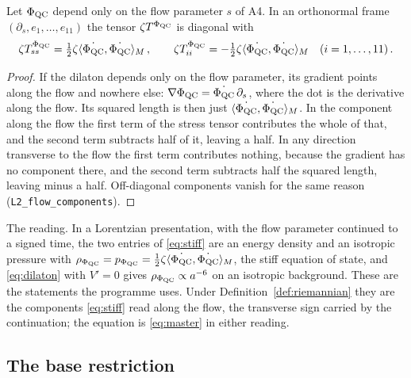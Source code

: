 \begin{proposition}\label{prop:stiff}
Let $\Phi_{\mathrm{QC}}$ depend only on the flow parameter $s$ of A4. In an orthonormal
frame $(\partial_{s},e_{1},\dots,e_{11})$ the tensor $\zeta T^{\Phi_{\mathrm{QC}}}$ is
diagonal with
\begin{equation}\label{eq:stiff}
  \zeta T^{\Phi_{\mathrm{QC}}}_{ss}=\tfrac12\zeta\langle\dot{\Phi_{\mathrm{QC}}},\dot{\Phi_{\mathrm{QC}}}\rangle_{M}\,,\qquad
  \zeta T^{\Phi_{\mathrm{QC}}}_{ii}=-\tfrac12\zeta\langle\dot{\Phi_{\mathrm{QC}}},\dot{\Phi_{\mathrm{QC}}}\rangle_{M}\quad(i=1,\dots,11)\,.
\end{equation}
\end{proposition}

\begin{proof}
If the dilaton depends only on the flow parameter, its gradient points
along the flow and nowhere else: $\nabla\Phi_{\mathrm{QC}}=\dot{\Phi_{\mathrm{QC}}}\,\partial_{s}$, where
the dot is the derivative along the flow. Its squared length is then just
$\langle\dot{\Phi_{\mathrm{QC}}},\dot{\Phi_{\mathrm{QC}}}\rangle_{M}$. In the component along the flow the
first term of the stress tensor contributes the whole of that, and the
second term subtracts half of it, leaving a half. In any direction
transverse to the flow the first term contributes nothing, because the
gradient has no component there, and the second term subtracts half the
squared length, leaving minus a half. Off-diagonal components vanish for
the same reason (\texttt{L2\_flow\_components}). \rigR
\end{proof}

The reading. In a Lorentzian presentation, with the flow parameter
continued to a signed time, the two entries of \eqref{eq:stiff} are an
energy density and an isotropic pressure with
$\rho_{\Phi_{\mathrm{QC}}}=p_{\Phi_{\mathrm{QC}}}=\tfrac12\zeta\langle\dot{\Phi_{\mathrm{QC}}},\dot{\Phi_{\mathrm{QC}}}\rangle_{M}$, the stiff equation of
state, and \eqref{eq:dilaton} with $V'=0$ gives $\rho_{\Phi_{\mathrm{QC}}}\propto a^{-6}$
on an isotropic background. These are the statements the programme uses.
Under Definition~\ref{def:riemannian} they are the components
\eqref{eq:stiff} read along the flow, the transverse sign carried by the
continuation; the equation is \eqref{eq:master} in either reading. \rigD

\subsection{The base restriction}\label{sec:base-restriction}

